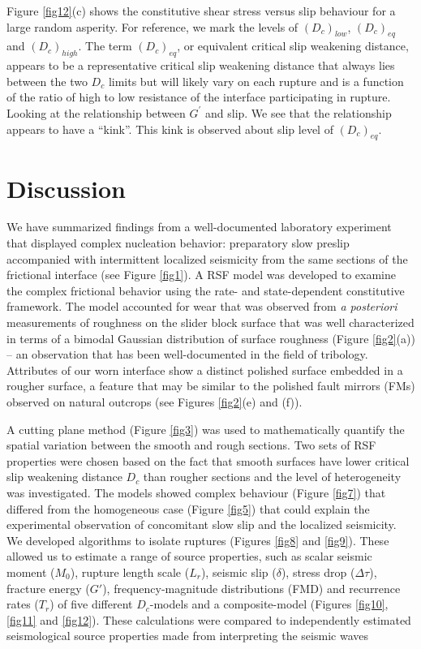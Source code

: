 \documentclass[preprint,1p, 10pt,authoryear]{elsarticle}
\begin{document}
Figure \ref{fig12}(c) shows the constitutive shear stress versus slip behaviour for a large random asperity. For reference, we mark the levels of $(D_{c})_{low}$, $(D_{c})_{eq}$ and $(D_{c})_{high}$.  The term $(D_{c})_{eq}$, or equivalent critical slip weakening distance, appears to be a representative critical slip weakening distance that always lies between the two $D_{c}$ limits but will likely vary on each rupture and is a function of the ratio of high to low resistance of the interface participating in rupture. Looking at the relationship between $G^{'}$ and slip. We see that the relationship appears to have a ``kink''.  This kink is observed about slip level of  $(D_{c})_{eq}$. 

\section{Discussion}
We have summarized findings from a well-documented laboratory experiment \citep{Selvadurai2015, Selvadurai2017, Selvadurai2019} that displayed complex nucleation behavior: preparatory slow preslip accompanied with intermittent localized seismicity from the same sections of the frictional interface (see Figure \ref{fig1}). A RSF model was developed to examine the complex frictional behavior using the rate- and state-dependent constitutive framework. The model accounted for wear that was observed from \textit{a posteriori} measurements of roughness on the slider block surface that was well characterized in terms of a bimodal Gaussian distribution of surface roughness (Figure \ref{fig2}(a)) -- an observation that has been well-documented in the field of tribology. Attributes of our worn interface show a distinct polished surface embedded in a rougher surface, a feature that may be similar to the polished fault mirrors (FMs) observed on natural outcrops (see Figures \ref{fig2}(e) and (f)).

A cutting plane method (Figure \ref{fig3}) was used to mathematically quantify the spatial variation between the smooth and rough sections. Two sets of RSF properties were chosen based on the fact that smooth surfaces have lower critical slip weakening distance $D_{c}$ than rougher sections and the level of heterogeneity was investigated. The models showed complex behaviour (Figure \ref{fig7}) that differed from the homogeneous case (Figure \ref{fig5}) that could explain the experimental observation of concomitant slow slip and the localized seismicity.  We developed algorithms to isolate ruptures (Figures \ref{fig8} and \ref{fig9}).  These allowed us to estimate a range of source properties, such as scalar seismic moment ($M_{0}$), rupture length scale ($L_{r}$), seismic slip ($\delta$), stress drop ($\Delta\tau$), fracture energy ($G'$), frequency-magnitude distributions (FMD) and recurrence rates ($T_{r}$) of five different $D_{c}$-models and a composite-model (Figures \ref{fig10}, \ref{fig11} and \ref{fig12}). These calculations were compared to independently estimated seismological source properties made from interpreting the seismic waves \citep{Selvadurai2019}
\end{document}
